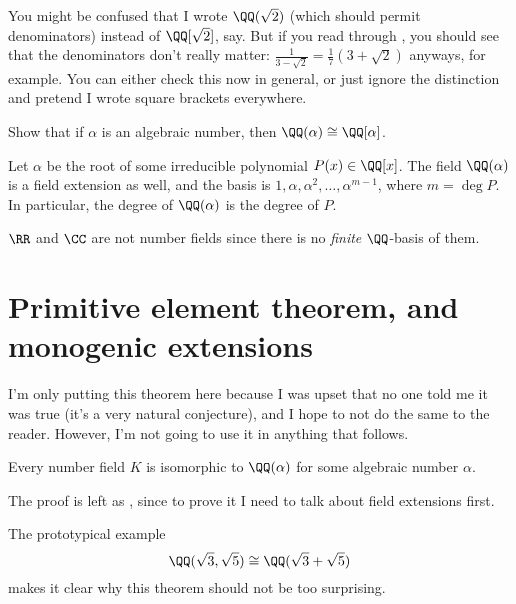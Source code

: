 You might be confused that I wrote $\QQ(\sqrt2)$
(which should permit denominators) instead of $\QQ[\sqrt2]$, say.
But if you read through ,
you should see that the denominators don't really matter:
$\frac{1}{3-\sqrt2} = \frac17(3+\sqrt2)$ anyways, for example.
You can either check this now in general,
or just ignore the distinction and pretend I wrote square brackets everywhere.
\begin{exercise}
	[Unimportant]
	Show that if $\alpha$ is an algebraic number,
	then $\QQ(\alpha) \cong \QQ[\alpha]$.
\end{exercise}

\begin{example}
	Let $\alpha$ be the root of some irreducible polynomial $P(x) \in \QQ[x]$.
	The field $\QQ(\alpha)$ is a field extension as well, and the basis
	is $1, \alpha, \alpha^2, \dots, \alpha^{m-1}$, where $m = \deg P$.
	In particular, the degree of $\QQ(\alpha)$ is the degree of $P$.
\end{example}
\begin{example}
	$\RR$ and $\CC$ are not number fields since there is no \emph{finite}
	$\QQ$-basis of them.
\end{example}

\section{Primitive element theorem, and monogenic extensions}

I'm only putting this theorem here because I was upset that no one
told me it was true (it's a very natural conjecture),
and I hope to not do the same to the reader.
However, I'm not going to use it in anything that follows.

\begin{theorem}
	Every number field $K$ is isomorphic to $\QQ(\alpha)$
	for some algebraic number $\alpha$.
	\label{thm:artin_primitive_elm}
\end{theorem}
The proof is left as , since to prove it I need to talk
about field extensions first.

The prototypical example \[ \QQ(\sqrt3,\sqrt5) \cong \QQ(\sqrt3+\sqrt5) \]
makes it clear why this theorem should not be too surprising.

